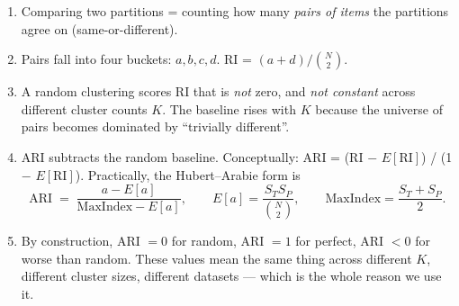 \documentclass[11pt]{article}
\begin{document}
\begin{enumerate}\setlength\itemsep{2pt}
  \item Comparing two partitions = counting how many \emph{pairs of items}
        the partitions agree on (same-or-different).
  \item Pairs fall into four buckets: $a, b, c, d$. RI = $(a + d) /
        \binom{N}{2}$.
  \item A random clustering scores RI that is \emph{not} zero, and
        \emph{not constant} across different cluster counts $K$. The
        baseline rises with $K$ because the universe of pairs becomes
        dominated by ``trivially different''.
  \item ARI subtracts the random baseline. Conceptually:
        ARI = (RI $-$ $E[\text{RI}]$) / (1 $-$ $E[\text{RI}]$).
        Practically, the Hubert--Arabie form is
        \[
          \text{ARI} \;=\; \frac{a - E[a]}{\mathrm{MaxIndex} - E[a]},
          \qquad
          E[a] = \frac{S_T S_P}{\binom{N}{2}},
          \qquad
          \mathrm{MaxIndex} = \frac{S_T + S_P}{2}.
        \]
  \item By construction, ARI $= 0$ for random, ARI $= 1$ for perfect,
        ARI $<0$ for worse than random. These values mean the same thing
        across different $K$, different cluster sizes, different
        datasets --- which is the whole reason we use it.
\end{enumerate}
\end{document}
